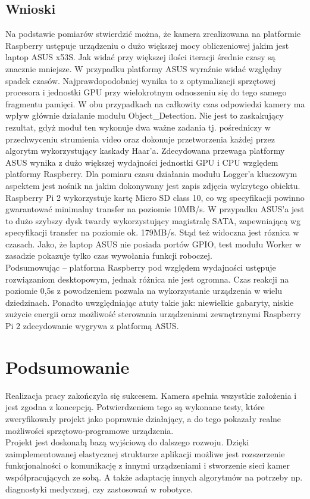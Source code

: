 \section{Wnioski}
Na podstawie pomiarów stwierdzić można, że kamera zrealizowana na platformie Raspberry ustępuje urządzeniu o dużo większej mocy obliczeniowej jakim jest laptop ASUS x53S.
Jak widać przy większej ilości iteracji średnie czasy są znacznie mniejsze. W przypadku platformy ASUS wyraźnie widać względny spadek czasów. Najprawdopodobniej wynika to z optymalizacji sprzętowej procesora i jednostki GPU przy wielokrotnym odnoszeniu się do tego samego fragmentu pamięci.
W obu przypadkach na całkowity czas odpowiedzi kamery ma wpływ głównie działanie modułu Object\_Detection. Nie jest to zaskakujący rezultat, gdyż moduł ten wykonuje dwa ważne zadania tj. pośredniczy w przechwyceniu strumienia video oraz dokonuje przetworzenia każdej przez algorytm wykorzystujący kaskady Haar’a. Zdecydowana przewaga platformy ASUS wynika z dużo większej wydajności jednostki GPU i CPU względem platformy Raspberry. Dla pomiaru czasu działania modułu Logger’a kluczowym aspektem jest nośnik na jakim dokonywany jest zapis zdjęcia wykrytego obiektu. 
Raspberry Pi 2 wykorzystuje kartę Micro SD class 10, co wg specyfikacji powinno gwarantować minimalny transfer na poziomie 10MB/s. W przypadku ASUS’a jest to dużo szybszy dysk twardy wykorzystujący magistralę SATA, zapewniającą wg specyfikacji transfer na poziomie ok. 179MB/s. Stąd też widoczna jest róznica w czasach.
Jako, że laptop ASUS nie posiada portów GPIO, test modułu Worker w zasadzie pokazuje tylko czas wywołania funkcji roboczej.\\
Podsumowując – platforma Raspberry pod względem wydajności ustępuje rozwiązaniom desktopowym, jednak różnica nie jest ogromna. Czas reakcji na poziomie 0,5s z powodzeniem pozwala na wykorzystanie urządzenia w wielu dziedzinach. Ponadto uwzględniając atuty takie jak: niewielkie gabaryty, niskie zużycie energii oraz możliwość sterowania urządzeniami zewnętrznymi Raspberry Pi 2 zdecydowanie wygrywa z platformą ASUS.


\chapter{Podsumowanie} 

Realizacja pracy zakończyła się sukcesem. Kamera spełnia wszystkie założenia i jest zgodna z koncepcją. Potwierdzeniem tego są wykonane testy, które zweryfikowały projekt jako poprawnie działający, a do tego pokazały realne możliwości sprzętowo-programowe urządzenia.\\
Projekt jest doskonałą bazą wyjściową do dalszego rozwoju. Dzięki zaimplementowanej elastycznej strukturze aplikacji możliwe jest rozszerzenie funkcjonalności o komunikację z innymi urządzeniami i stworzenie sieci kamer współpracujących ze sobą. A także adaptację innych algorytmów na potrzeby np. diagnostyki medycznej, czy zastosowań w robotyce.